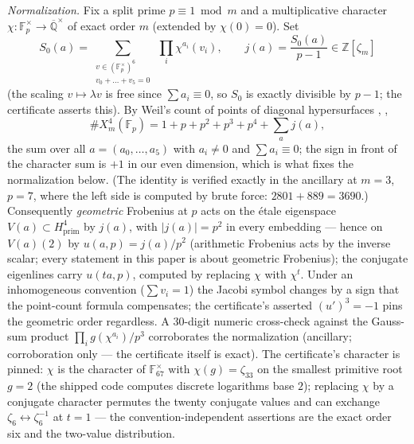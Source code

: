 \documentclass[11pt]{amsart}
\theoremstyle{remark}
\newcommand{\Q}{\mathbb{Q}}
\newcommand{\Z}{\mathbb{Z}}
\newcommand{\F}{\mathbb{F}}
\newcommand{\V}{V}
\newcommand{\zt}{\zeta}
\newcommand{\Qbar}{\overline{\Q}}
\begin{document}
\emph{Normalization.} Fix a split prime $p\equiv1\bmod m$ and a multiplicative character
$\chi\colon\F_p^\times\to\Qbar^\times$ of exact order $m$ (extended by $\chi(0)=0$). Set
\[
S_0(a)=\sum_{\substack{v\in(\F_p^\times)^6\\ v_0+\dots+v_5=0}}\ \prod_{i}\chi^{a_i}(v_i),
\qquad j(a)=\frac{S_0(a)}{p-1}\in\Z[\zt_m]
\]
(the scaling $v\mapsto\lambda v$ is free since $\sum a_i\equiv0$, so $S_0$ is exactly
divisible by $p-1$; the certificate asserts this). By Weil's count of points of diagonal
hypersurfaces \cite[pp.~500--502]{Weil49}, \cite{Weil52},
\[
\#X^4_m(\F_p)=1+p+p^2+p^3+p^4+\sum_a j(a),
\]
the sum over all $a=(a_0,\dots,a_5)$ with $a_i\neq0$ and $\sum a_i\equiv0$; the sign in front
of the character sum is $+1$ in our even dimension, which is what fixes the normalization below.
(The identity is verified exactly in the ancillary at $m=3$, $p=7$, where the left side is
computed by brute force: $2801+889=3690$.) Consequently \emph{geometric} Frobenius at $p$
acts on the \'etale eigenspace $\V(a)\subset H^4_{\mathrm{prim}}$ by $j(a)$, with
$|j(a)|=p^2$ in every embedding --- hence on $\V(a)(2)$ by $u(a,p)=j(a)/p^2$ (arithmetic Frobenius acts by the inverse scalar;
every statement in this paper is about geometric Frobenius); the conjugate eigenlines carry
$u(ta,p)$, computed by replacing $\chi$ with $\chi^t$. Under an inhomogeneous convention
($\sum v_i=1$) the Jacobi symbol changes by a sign that the point-count formula compensates;
the certificate's asserted $(u')^3=-1$ pins the geometric order regardless. A $30$-digit
numeric cross-check against the Gauss-sum product $\prod_ig(\chi^{a_i})/p^3$ corroborates
the normalization (ancillary; corroboration only --- the certificate itself is exact).
The certificate's character is pinned: $\chi$ is the character of $\F_{67}^\times$ with
$\chi(g)=\zt_{33}$ on the smallest primitive root $g=2$ (the shipped code computes discrete
logarithms base $2$); replacing $\chi$ by a conjugate character permutes the twenty conjugate
values and can exchange $\zt_6\leftrightarrow\zt_6^{-1}$ at $t=1$ --- the
convention-independent assertions are the exact order six and the two-value distribution.
\end{document}
